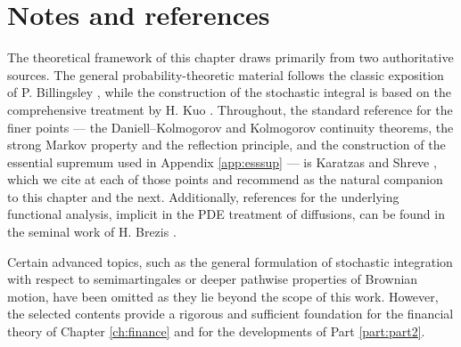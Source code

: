 \section*{Notes and references}

\noindent
The theoretical framework of this chapter draws primarily from two authoritative sources. The general probability-theoretic material follows the classic exposition of P. Billingsley \cite{billingsley1995}, while the construction of the stochastic integral is based on the comprehensive treatment by H. Kuo \cite{kuo2006}. Throughout, the standard reference for the finer points --- the Daniell--Kolmogorov and Kolmogorov continuity theorems, the strong Markov property and the reflection principle, and the construction of the essential supremum used in Appendix \ref{app:esssup} --- is Karatzas and Shreve \cite{karatzasshreve1991}, which we cite at each of those points and recommend as the natural companion to this chapter and the next. Additionally, references for the underlying functional analysis, implicit in the PDE treatment of diffusions, can be found in the seminal work of H. Brezis \cite{brezis2011}.

Certain advanced topics, such as the general formulation of stochastic integration with respect to semimartingales or deeper pathwise properties of Brownian motion, have been omitted as they lie beyond the scope of this work. However, the selected contents provide a rigorous and sufficient foundation for the financial theory of Chapter \ref{ch:finance} and for the developments of Part \ref{part:part2}.
